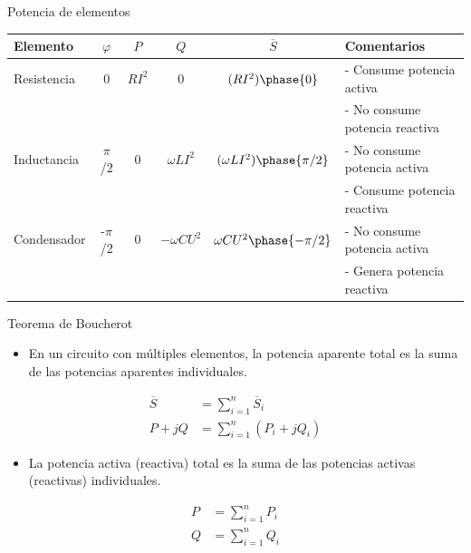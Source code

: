 \documentclass[aspectratio=169, usenames,svgnames,dvipsnames]{beamer}
\begin{document}
\begin{frame}[label={sec:orga3736dd}]{Potencia de elementos}
\begin{center}
\begin{tabular}{lccccl}
\toprule
\large \alert{Elemento} & \large \alert{\(\varphi\)} & \large \alert{\(P\)} & \large \alert{\(Q\)} & \large \alert{\(\overline{S}\)} & \large \alert{Comentarios}\\
\midrule
Resistencia & 0 & \(R I^2\) & 0 & \((R I^2) \phase{0}\) & - Consume potencia activa\\
 &  &  &  &  & - No consume potencia reactiva\\
\midrule
Inductancia & \(\pi\)/2 & 0 & \(\omega L I^2\) & \((\omega L I^2) \phase{\pi/2}\) & - No consume potencia activa\\
 &  &  &  &  & - Consume potencia reactiva\\
\midrule
Condensador & -\(\pi\)/2 & 0 & \(- \omega C U^2\) & \(\omega C U^2 \phase{-\pi/2}\) & - No consume potencia activa\\
 &  &  &  &  & - Genera potencia reactiva\\
\bottomrule
\end{tabular}
\end{center}
\end{frame}


\begin{frame}[label={sec:org67884d7}]{Teorema de Boucherot}
\begin{itemize}
\item En un circuito con múltiples elementos, la potencia aparente total es la suma de las potencias aparentes individuales.
\end{itemize}
\begin{align*}
  \overline{S} &= \sum_{i = 1}^{n} \overline{S}_i\\
  P + jQ &= \sum^n_{i = 1} (P_i + jQ_i)
\end{align*}

\begin{itemize}
\item La potencia activa (reactiva) total es la suma de las potencias activas (reactivas) individuales.
\end{itemize}

\begin{align*}
P &= \sum_{i = 1}^n P_i\\
Q &= \sum_{i = 1}^n Q_i
\end{align*}
\end{frame}
\end{document}
